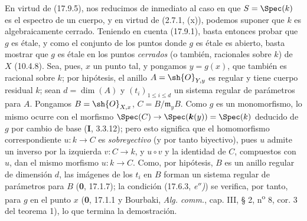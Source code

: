 En virtud de (17.9.5), nos reducimos de inmediato al caso en que $S=\Spec(k)$ es el espectro de un cuerpo, y en virtud de (2.7.1, (x)), podemos suponer que $k$ es algebraicamente cerrado. Teniendo en cuenta (17.9.1), basta entonces probar que $g$ es étale, y como el conjunto de los puntos donde $g$ es étale es abierto, basta mostrar que $g$ es étale en los puntos \emph{cerrados} (o también, racionales sobre $k$) de $X$ (10.4.8). Sea, pues, $x$ un punto tal, y pongamos $y=g(x)$, que también es racional sobre $k$; por hipótesis, el anillo $A=\sh{O}_{Y,y}$ es regular y tiene cuerpo residual $k$; sean $d=\dim(A)$ y $(t_i)_{1\leq i\leq d}$ un sistema regular de parámetros para $A$. Pongamos $B=\sh{O}_{X,x}$, $C=B/\mathfrak m_yB$. Como $g$ es un monomorfismo, lo mismo ocurre con el morfismo $\Spec(C)\to\Spec(\boldsymbol k(y))=\Spec(k)$ deducido de $g$ por cambio de base (\textbf I, 3.3.12); pero esto significa que el homomorfismo correspondiente $u:k\to C$ es \emph{sobreyectivo} (y por tanto biyectivo), pues $u$ admite un inverso por la izquierda $v:C\to k$, y $u\circ v$ y la identidad de $C$, compuestos con $u$, dan el mismo morfismo $u:k\to C$. Como, por hipótesis, $B$ es un anillo regular de dimensión $d$, las imágenes de los $t_i$ en $B$ forman un sistema regular de parámetros para $B$ (\textbf 0, 17.1.7); la condición (17.6.3, \emph{e$''$)}) se verifica, por tanto, para $g$ en el punto $x$ (\textbf 0, 17.1.1 y Bourbaki, \emph{Alg. comm.}, cap. III, § 2, n\textsuperscript{o} 8, cor. 3 del teorema 1), lo que termina la demostración.
